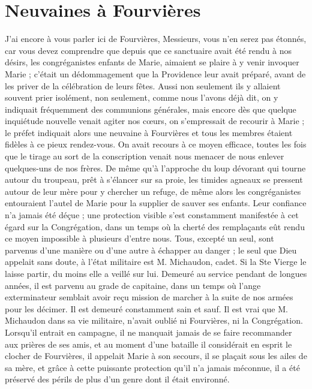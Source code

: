 \section*{Neuvaines à Fourvières}
J'ai encore à vous parler ici de Fourvières, Messieurs, vous n'en serez pas étonnés, car vous devez comprendre que depuis que ce sanctuaire avait été rendu à nos désirs, les congréganistes enfants de Marie, aimaient se plaire à y venir invoquer Marie ; c'était un dédommagement que la Providence leur avait préparé, avant de les priver de la célébration de leurs fêtes. Aussi non seulement ils y allaient souvent prier isolément, non seulement, comme nous l'avons déjà dit, on y indiquait fréquemment des communions générales, mais encore dès que quelque inquiétude nouvelle venait agiter nos cœurs, on s'empressait de recourir à Marie ; le préfet indiquait alors une neuvaine à Fourvières et tous les membres étaient fidèles à ce pieux rendez-vous. On avait recours à ce moyen efficace, toutes les fois que le tirage au sort de la conscription venait nous menacer de nous enlever quelques-uns de nos frères. De même qu'à l'approche du loup dévorant qui tourne autour du troupeau, prêt à s'élancer sur sa proie, les timides agneaux se pressent autour de leur mère pour y chercher un refuge, de même alors les congréganistes entouraient l'autel de Marie pour la supplier de sauver ses enfants. Leur confiance n'a jamais été déçue ; une protection visible s'est constamment manifestée à cet égard sur la Congrégation, dans un temps où la cherté des remplaçants eût rendu ce moyen impossible à plusieurs d'entre nous. Tous, excepté un seul, sont parvenus d'une manière ou d'une autre à échapper au danger ; le seul que Dieu appelait sans doute, à l'état militaire est M. Michaudon, cadet. Si la Ste Vierge
le laisse partir, du moins elle a veillé sur lui. Demeuré au service pendant de longues années, il est parvenu au grade de capitaine, dans un temps où l'ange exterminateur semblait avoir reçu mission de marcher à la suite de nos armées pour les décimer. Il est demeuré constamment sain et sauf. Il est vrai que M. Michaudon dans sa vie militaire, n'avait oublié ni Fourvières, ni la Congrégation. Lorsqu'il entrait en campagne, il ne manquait jamais de se faire recommander aux prières de ses amis, et au moment d'une bataille il considérait en esprit le clocher de Fourvières, il appelait Marie à son secours, il se plaçait sous les ailes de sa mère, et grâce à cette puissante protection qu'il n'a jamais méconnue, il a été préservé des périls de plus d'un genre dont il était environné.

